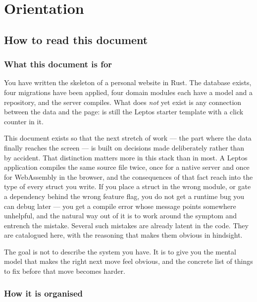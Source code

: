 \part{Orientation}

\chapter{How to read this document}

\section{What this document is for}

You have written the skeleton of a personal website in Rust. The database exists, four
migrations have been applied, four domain modules each have a model and a repository, and
the server compiles. What does \emph{not} yet exist is any connection between the data and the
page:  is still the Leptos starter template with a click counter in it.

This document exists so that the next stretch of work --- the part where the data finally
reaches the screen --- is built on decisions made deliberately rather than by accident. That
distinction matters more in this stack than in most. A Leptos application compiles the same
source file twice, once for a native server and once for WebAssembly in the browser, and the
consequences of that fact reach into the type of every struct you write. If you place a struct
in the wrong module, or gate a dependency behind the wrong feature flag, you do not get a
runtime bug you can debug later --- you get a compile error whose message points somewhere
unhelpful, and the natural way out of it is to work around the symptom and entrench the mistake.
Several such mistakes are already latent in the code. They are catalogued here, with the
reasoning that makes them obvious in hindsight.

\begin{keyidea}
The goal is not to describe the system you have. It is to give you the mental model that makes
the right next move feel obvious, and the concrete list of things to fix before that move
becomes harder.
\end{keyidea}

\section{How it is organised}

